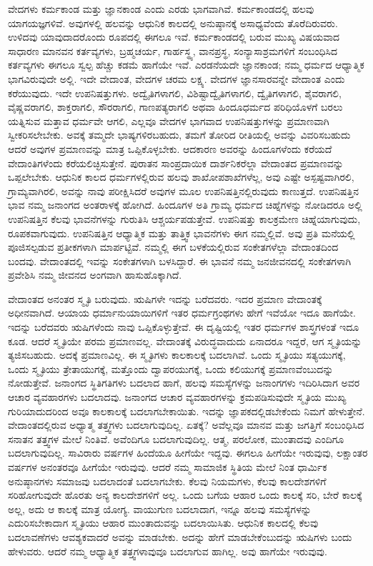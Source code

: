 ವೇದಗಳು ಕರ್ಮಕಾಂಡ ಮತ್ತು ಜ್ಞಾನಕಾಂಡ ಎಂದು ಎರಡು ಭಾಗವಾಗಿವೆ. ಕರ್ಮಕಾಂಡದಲ್ಲಿ ಹಲವು ಯಾಗಯಜ್ಞಗಳಿವೆ. ಅವುಗಳಲ್ಲಿ ಹಲವನ್ನು ಆಧುನಿಕ ಕಾಲದಲ್ಲಿ ಅನುಷ್ಠಾನಕ್ಕೆ ಅಸಾಧ್ಯವೆಂದು ತೊರೆದಿರುವರು. ಉಳಿದವು ಯಾವುದಾದರೊಂದು ರೂಪದಲ್ಲಿ ಈಗಲೂ ಇವೆ. ಕರ್ಮಕಾಂಡದಲ್ಲಿ ಬರುವ ಮುಖ್ಯ ವಿಷಯವಾದ ಸಾಧಾರಣ ಮಾನವನ ಕರ್ತವ್ಯಗಳು, ಬ್ರಹ್ಮಚರ್ಯ, ಗಾರ್ಹಸ್ಥ್ಯ, ವಾನಪ್ರಸ್ಥ, ಸಂನ್ಯಾಸಾಶ್ರಮಗಳಿಗೆ ಸಂಬಂಧಿಸಿದ ಕರ್ತವ್ಯಗಳು ಈಗಲೂ ಸ್ವಲ್ಪ ಹೆಚ್ಚು ಕಡಮೆ ಹಾಗೆಯೇ ಇವೆ. ಎರಡನೆಯದೇ ಜ್ಞಾನಕಾಂಡ; ನಮ್ಮ ಧರ್ಮದ ಆಧ್ಯಾತ್ಮಿಕ ಭಾಗವಿರುವುದೇ ಅಲ್ಲಿ. ಇದೇ ವೇದಾಂತ, ವೇದಗಳ ಚರಮ ಲಕ್ಷ್ಯ. ವೇದಗಳ ಜ್ಞಾನಸಾರವನ್ನೇ ವೇದಾಂತ ಎಂದು ಕರೆಯುವುದು. ಇದೇ ಉಪನಿಷತ್ತುಗಳು. ಅದ್ವೈತಿಗಳಾಗಲಿ, ವಿಶಿಷ್ಟಾದ್ವೈತಿಗಳಾಗಲಿ, ದ್ವೈತಿಗಳಾಗಲಿ, ಶೈವರಾಗಲಿ, ವೈಷ್ಣವರಾಗಲಿ, ಶಾಕ್ತರಾಗಲಿ, ಸೌರರಾಗಲಿ, ಗಾಣಪತ್ಯರಾಗಲಿ ಅಥವಾ ಹಿಂದೂಧರ್ಮದ ಪರಿಧಿಯೊಳಗೆ ಬರಲು ಯತ್ನಿಸುವ ಮತ್ತಾವ ಧರ್ಮವೇ ಆಗಲಿ, ಎಲ್ಲವೂ ವೇದಗಳ ಭಾಗವಾದ ಉಪನಿಷತ್ತುಗಳನ್ನು ಪ್ರಮಾಣವಾಗಿ ಸ್ವೀಕರಿಸಲೇಬೇಕು. ಅವಕ್ಕೆ ತಮ್ಮದೇ ಭಾಷ್ಯಗಳಿರಬಹುದು, ತಮಗೆ ತೋರಿದ ರೀತಿಯಲ್ಲಿ ಅವನ್ನು ವಿವರಿಸಬಹುದು ಆದರೆ ಅವುಗಳ ಪ್ರಮಾಣವನ್ನು ಮಾತ್ರ ಒಪ್ಪಿಕೊಳ್ಳಬೇಕು. ಆದಕಾರಣ ಅವರನ್ನು ಹಿಂದೂಗಳೆಂದು ಕರೆಯದೆ ವೇದಾಂತಿಗಳೆಂದು ಕರೆಯಲಿಚ್ಛಿಸುತ್ತೇನೆ. ಪುರಾತನ ಸಾಂಪ್ರದಾಯಿಕ ದಾರ್ಶನಿಕರೆಲ್ಲಾ ವೇದಾಂತದ ಪ್ರಮಾಣವನ್ನು ಒಪ್ಪಲೇಬೇಕು. ಆಧುನಿಕ ಕಾಲದ ಧರ್ಮಗಳಲ್ಲಿರುವ ಹಲವು ಶಾಖೋಪಶಾಖೆಗಳೆಲ್ಲ, ಅವು ಎಷ್ಟೇ ಅಸ್ಪಷ್ಟವಾಗಿರಲಿ, ಗ್ರಾಮ್ಯವಾಗಿರಲಿ, ಅವನ್ನು ನಾವು ಪರೀಕ್ಷಿಸಿದರೆ ಅವುಗಳ ಮೂಲ ಉಪನಿಷತ್ತಿನಲ್ಲಿರುವುದು ಕಾಣುತ್ತದೆ. ಉಪನಿಷತ್ತಿನ ಭಾವ ನಮ್ಮ ಜನಾಂಗದ ಅಂತರಾಳಕ್ಕೆ ಹೋಗಿದೆ. ಹಿಂದೂಗಳ ಅತಿ ಗ್ರಾಮ್ಯ ಧರ್ಮದ ಚಿಹ್ನೆಗಳನ್ನು ನೋಡಿದರೂ ಅಲ್ಲಿ ಉಪನಿಷತ್ತಿನ ಕೆಲವು ಭಾವನೆಗಳನ್ನು ಗುರುತಿಸಿ ಆಶ್ಚರ್ಯಪಡುತ್ತೇವೆ. ಉಪನಿಷತ್ತು ಕಾಲಕ್ರಮೇಣ ಚಿಹ್ನೆಯಾಗುವುದು, ರೂಪಕವಾಗುವುದು. ಉಪನಿಷತ್ತಿನ ಆಧ್ಯಾತ್ಮಿಕ ಮತ್ತು ತಾತ್ತ್ವಿಕ ಭಾವನೆಗಳು ಈಗ ನಮ್ಮಲ್ಲಿವೆ. ಅವು ಪ್ರತಿ ಮನೆಯಲ್ಲಿ ಪೂಜಿಸಲ್ಪಡುವ ಪ್ರತೀಕಗಳಾಗಿ ಮಾರ್ಪಟ್ಟಿವೆ. ನಮ್ಮಲ್ಲಿ ಈಗ ಬಳಕೆಯಲ್ಲಿರುವ ಸಂಕೇತಗಳೆಲ್ಲಾ ವೇದಾಂತದಿಂದ ಬಂದವು. ವೇದಾಂತದಲ್ಲಿ ಇವನ್ನು ಸಂಕೇತಗಳಾಗಿ ಬಳಸಿದ್ದಾರೆ. ಈ ಭಾವನೆ ನಮ್ಮ ಜನಜೀವನದಲ್ಲಿ ಸಂಕೇತಗಳಾಗಿ ಪ್ರವೇಶಿಸಿ ನಮ್ಮ ಜೀವನದ ಅಂಗವಾಗಿ ಹಾಸುಹೊಕ್ಕಾಗಿದೆ.

ವೇದಾಂತದ ಅನಂತರ ಸ್ಮೃತಿ ಬರುವುದು. ಋಷಿಗಳೇ ಇದನ್ನು ಬರೆದವರು. ಇದರ ಪ್ರಮಾಣ ವೇದಾಂತಕ್ಕೆ ಅಧೀನವಾಗಿದೆ. ಆಯಾಯ ಧರ್ಮಾನುಯಾಯಿಗಳಿಗೆ ಇತರ ಧರ್ಮಗ್ರಂಥಗಳು ಹೇಗೆ ಇವೆಯೋ ಇದೂ ಹಾಗೆಯೇ. ಇದನ್ನು ಬರೆದವರು ಋಷಿಗಳೆಂದು ನಾವು ಒಪ್ಪಿಕೊಳ್ಳುತ್ತೇವೆ. ಈ ದೃಷ್ಟಿಯಲ್ಲಿ ಇತರ ಧರ್ಮಗಳ ಶಾಸ್ತ್ರಗಳಂತೆ ಇದೂ ಕೂಡ. ಆದರೆ ಸ್ಮೃತಿಯೇ ಪರಮ ಪ್ರಮಾಣವಲ್ಲ. ವೇದಾಂತಕ್ಕೆ ವಿರುದ್ಧವಾದುದು ಏನಾದರೂ ಇದ್ದರೆ, ಆಗ ಸ್ಮೃತಿಯನ್ನು ತ್ಯಜಿಸಬಹುದು. ಅದಕ್ಕೆ ಪ್ರಮಾಣವಿಲ್ಲ. ಈ ಸ್ಮೃತಿಗಳು ಕಾಲಕಾಲಕ್ಕೆ ಬದಲಾಗಿವೆ. ಒಂದು ಸ್ಮೃತಿಯು ಸತ್ಯಯುಗಕ್ಕೆ, ಒಂದು ಸ್ಮೃತಿಯು ತ್ರೇತಾಯುಗಕ್ಕೆ, ಮತ್ತೊಂದು ದ್ವಾಪರಯುಗಕ್ಕೆ, ಒಂದು ಕಲಿಯುಗಕ್ಕೆ ಪ್ರಮಾಣವೆಂಬುದನ್ನು ನೋಡುತ್ತೇವೆ. ಜನಾಂಗದ ಸ್ಥಿತಿಗತಿಗಳು ಬದಲಾದ ಹಾಗೆ, ಹಲವು ಸಮಸ್ಯೆಗಳನ್ನು ಜನಾಂಗಗಳು ಇದಿರಿಸಿದಾಗ ಅವರ ಆಚಾರ ವ್ಯವಹಾರಗಳು ಬದಲಾದವು. ಜನಾಂಗದ ಆಚಾರ ವ್ಯವಹಾರಗಳನ್ನು ಕ್ರಮಪಡಿಸುವುದೇ ಸ್ಮೃತಿಯ ಮುಖ್ಯ ಗುರಿಯಾದುದರಿಂದ ಅವೂ ಕಾಲಕಾಲಕ್ಕೆ ಬದಲಾಗಬೇಕಾಯಿತು. ಇದನ್ನು ಜ್ಞಾಪಕದಲ್ಲಿಡಬೇಕೆಂದು ನಿಮಗೆ ಹೇಳುತ್ತೇನೆ. ವೇದಾಂತದಲ್ಲಿರುವ ಅಧ್ಯಾತ್ಮ ತತ್ತ್ವಗಳು ಬದಲಾಗುವುದಿಲ್ಲ. ಏತಕ್ಕೆ? ಅವೆಲ್ಲವೂ ಮಾನವ ಮತ್ತು ಜಗತ್ತಿಗೆ ಸಂಬಂಧಿಸಿದ ಸನಾತನ ತತ್ತ್ವಗಳ ಮೇಲೆ ನಿಂತಿವೆ. ಅವೆಂದಿಗೂ ಬದಲಾಗುವುದಿಲ್ಲ. ಆತ್ಮ, ಪರಲೋಕ, ಮುಂತಾದವು ಎಂದಿಗೂ ಬದಲಾಗುವುದಿಲ್ಲ. ಸಾವಿರಾರು ವರ್ಷಗಳ ಹಿಂದೆಯೂ ಹೀಗೆಯೇ ಇದ್ದವು. ಈಗಲೂ ಹೀಗೆಯೇ ಇರುವುವು, ಲಕ್ಷಾಂತರ ವರ್ಷಗಳ ಅನಂತರವೂ ಹೀಗೆಯೇ ಇರುವುವು. ಆದರೆ ನಮ್ಮ ಸಾಮಾಜಿಕ ಸ್ಥಿತಿಯ ಮೇಲೆ ನಿಂತ ಧಾರ್ಮಿಕ ಅನುಷ್ಠಾನಗಳು ಸಮಾಜವು ಬದಲಾದಂತೆ ಬದಲಾಗಬೇಕು. ಕೆಲವು ನಿಯಮಗಳು, ಕೆಲವು ಕಾಲದೇಶಗಳಿಗೆ ಸರಿಹೋಗುವುದೇ ಹೊರತು ಅನ್ಯ ಕಾಲದೇಶಗಳಿಗೆ ಅಲ್ಲ. ಒಂದು ಬಗೆಯ ಆಹಾರ ಒಂದು ಕಾಲಕ್ಕೆ ಸರಿ, ಬೇರೆ ಕಾಲಕ್ಕೆ ಅಲ್ಲ, ಅದು ಆ ಕಾಲಕ್ಕೆ ಮಾತ್ರ ಯೋಗ್ಯ. ವಾಯುಗುಣ ಬದಲಾದಾಗ, ಇನ್ನೂ ಹಲವು ಸಮಸ್ಯೆಗಳನ್ನು ಎದುರಿಸಬೇಕಾದಾಗ ಸ್ಮೃತಿಯು ಆಹಾರ ಮುಂತಾದುವನ್ನು ಬದಲಾಯಿಸಿತು. ಆಧುನಿಕ ಕಾಲದಲ್ಲಿ ಕೆಲವು ಬದಲಾವಣೆಗಳು ಆವಶ್ಯಕವಾದರೆ ಅವನ್ನು ಮಾಡಬೇಕು. ಅದನ್ನು ಹೇಗೆ ಮಾಡಬೇಕೆಂಬುದನ್ನು ಋಷಿಗಳು ಬಂದು ಹೇಳುವರು. ಆದರೆ ನಮ್ಮ ಆಧ್ಯಾತ್ಮಿಕ ತತ್ತ್ವಗಳಾವುವೂ ಬದಲಾಗುವ ಹಾಗಿಲ್ಲ. ಅವು ಹಾಗೆಯೇ ಇರುವುವು.

